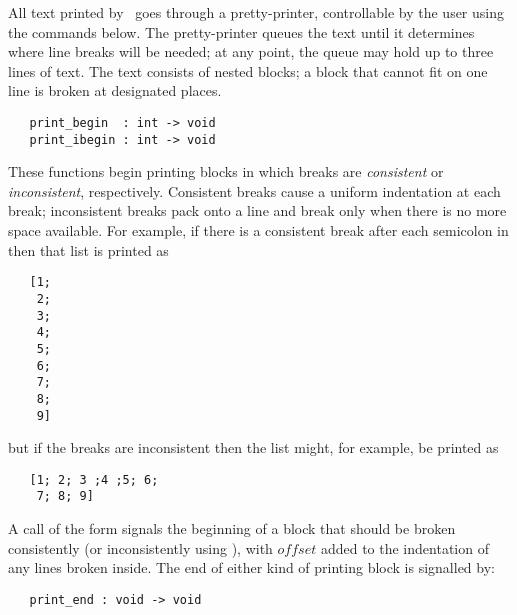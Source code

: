 All text printed by \ML\ goes through a pretty-printer, controllable by the
user using the commands below. The pretty-printer queues the text until it
determines where line breaks will be needed; at any point, the queue may hold
up to three lines of text. The text consists of nested blocks; a block that
cannot fit on one line is broken at designated places.


\begin{boxed}
\begin{verbatim}
   print_begin  : int -> void
   print_ibegin : int -> void
\end{verbatim}\end{boxed}

\noindent These functions begin printing blocks in which
breaks 
 are {\it consistent\/}
or {\it inconsistent\/}, respectively. Consistent breaks cause a uniform
indentation at each break; inconsistent breaks pack onto a line and 
break only when
there is no more space available. For example, if there is a consistent break
after each semicolon in \ml{[1;2;3;4;5;6;7;8;9]} then that list is printed as

\begin{hol}\begin{verbatim}
   [1;
    2;
    3;
    4;
    5;
    6;
    7;
    8;
    9]
\end{verbatim}\end{hol}

\noindent but if the breaks are inconsistent then the list might,
for example, be printed
as

\begin{hol}\begin{verbatim}
   [1; 2; 3 ;4 ;5; 6;
    7; 8; 9]
\end{verbatim}\end{hol}

\noindent A call of the form 
 signals the beginning of a block that should
be broken consistently (or inconsistently using ), 
with $offset$ 
added to the indentation of any lines broken inside.  The end of either kind of
printing block is signalled by:

\begin{boxed}
\begin{verbatim}
   print_end : void -> void
\end{verbatim}\end{boxed}

